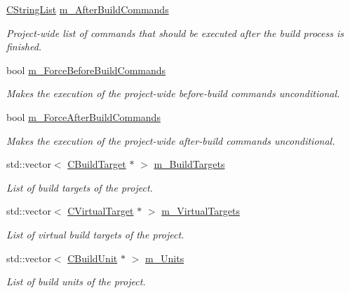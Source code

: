\begin{DoxyCompactItemize}
\hyperlink{classCStringList}{C\-String\-List} \hyperlink{classCCodeBlocksProject_a8ab245f49e6a9c903873054f36fc3131}{m\-\_\-\-After\-Build\-Commands}
\begin{DoxyCompactList}\small\item\em Project-\/wide list of commands that should be executed after the build process is finished. \end{DoxyCompactList}\item 
bool \hyperlink{classCCodeBlocksProject_a42c6e9a55bf442874867b2ae3b6bdbbd}{m\-\_\-\-Force\-Before\-Build\-Commands}
\begin{DoxyCompactList}\small\item\em Makes the execution of the project-\/wide before-\/build commands unconditional. \end{DoxyCompactList}\item 
bool \hyperlink{classCCodeBlocksProject_aab5e897056f92e3c44fffa1e1d433def}{m\-\_\-\-Force\-After\-Build\-Commands}
\begin{DoxyCompactList}\small\item\em Makes the execution of the project-\/wide after-\/build commands unconditional. \end{DoxyCompactList}\item 
std\-::vector$<$ \hyperlink{classCBuildTarget}{C\-Build\-Target} $\ast$ $>$ \hyperlink{classCCodeBlocksProject_a52d04e025e60af9d48f9e2f09cb02ab9}{m\-\_\-\-Build\-Targets}
\begin{DoxyCompactList}\small\item\em List of build targets of the project. \end{DoxyCompactList}\item 
std\-::vector$<$ \hyperlink{classCVirtualTarget}{C\-Virtual\-Target} $\ast$ $>$ \hyperlink{classCCodeBlocksProject_aad946890adbdb724f9ae4fd882f07b91}{m\-\_\-\-Virtual\-Targets}
\begin{DoxyCompactList}\small\item\em List of virtual build targets of the project. \end{DoxyCompactList}\item 
std\-::vector$<$ \hyperlink{classCBuildUnit}{C\-Build\-Unit} $\ast$ $>$ \hyperlink{classCCodeBlocksProject_a7497caf84019495f7a31a259db36f74f}{m\-\_\-\-Units}
\begin{DoxyCompactList}\small\item\em List of build units of the project. \end{DoxyCompactList}\item 

\end{DoxyCompactItemize}
